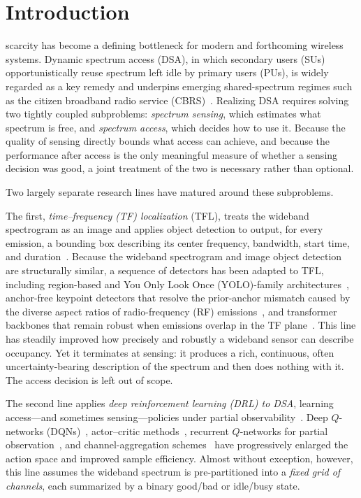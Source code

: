\section{Introduction}
\label{sec:introduction}

 scarcity has become a defining bottleneck for
modern and forthcoming wireless systems. Dynamic spectrum access (DSA),
in which secondary users (SUs) opportunistically reuse spectrum left idle by
primary users (PUs), is widely regarded as a key remedy and underpins
emerging shared-spectrum regimes such as the citizen broadband radio service
(CBRS)~\cite{sohul2015cbrs}. Realizing DSA requires solving two tightly
coupled subproblems: \emph{spectrum sensing}, which estimates what spectrum
is free, and \emph{spectrum access}, which decides how to use it. Because the
quality of sensing directly bounds what access can achieve, and because the
performance after access is the only meaningful measure of whether a sensing
decision was good, a joint treatment of the two is necessary rather than
optional.

Two largely separate research lines have matured around these subproblems.

The first, \emph{time--frequency (TF) localization} (TFL), treats the
wideband spectrogram as an image and applies object detection to output, for
every emission, a bounding box describing its center frequency, bandwidth,
start time, and duration~\cite{prasad2020,li2022hf}. Because the wideband
spectrogram and image object detection are structurally similar, a sequence
of detectors has been adapted to TFL, including region-based and You Only Look
Once (YOLO)-family architectures~\cite{prasad2020,li2022hf}, anchor-free
keypoint detectors that resolve the prior-anchor mismatch caused by the diverse
aspect ratios of radio-frequency (RF) emissions~\cite{zhao2024uav}, and transformer backbones that remain robust
when emissions overlap in the TF plane~\cite{zhao2025trtfl_ssl,
zhang2024spectrumtransformer}. This line has steadily improved how precisely
and robustly a wideband sensor can describe occupancy. Yet it terminates at
sensing: it produces a rich, continuous, often uncertainty-bearing
description of the spectrum and then does nothing with it. The access
decision is left out of scope.

The second line applies \emph{deep reinforcement learning (DRL) to DSA},
learning access---and sometimes sensing---policies under partial
observability~\cite{wang2018,zhong2019,xu2020partial,li2020aggregation,
li2024hmadrl,bokobza2023ddqsa}. Deep $Q$-networks (DQNs)~\cite{wang2018},
actor--critic methods~\cite{zhong2019}, recurrent $Q$-networks for partial
observation~\cite{xu2020partial,hausknecht2015drqn}, and channel-aggregation
schemes~\cite{li2020aggregation} have progressively enlarged the action space
and improved sample efficiency. Almost without exception, however, this line
assumes the wideband spectrum is pre-partitioned into a \emph{fixed grid of
channels}, each summarized by a binary good/bad or idle/busy state.

